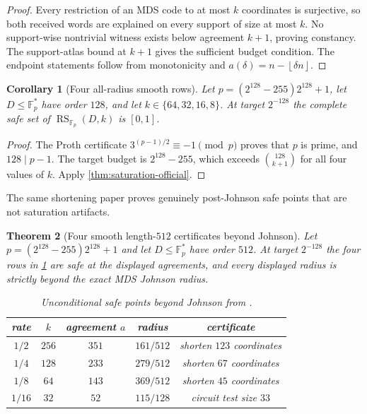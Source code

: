 \documentclass[11pt,a4paper]{amsart}
\numberwithin{equation}{section}
\newtheorem{theorem}{Theorem}[section]
\newtheorem{corollary}[theorem]{Corollary}
\theoremstyle{remark}
\DeclareMathOperator{\RS}{RS}
\newcommand{\F}{\mathbb F}
\newcommand{\floor}[1]{\left\lfloor#1\right\rfloor}
\begin{document}
\begin{proof}
Every restriction of an MDS code to at most $k$ coordinates is surjective, so both received words are explained on every support of size at most $k$.  No support-wise nontrivial witness exists below agreement $k+1$, proving constancy.  The support-atlas bound at $k+1$ gives the sufficient budget condition.  The endpoint statements follow from monotonicity and $a(\delta)=n-\floor{\delta n}$.
\end{proof}

\begin{corollary}[Four all-radius smooth rows]\label{cor:saturated-rows}
Let $p=(2^{128}-255)2^{128}+1$, let $D\le\F_p^*$ have order $128$, and let $k\in\{64,32,16,8\}$.  At target $2^{-128}$ the complete safe set of $\RS_{\F_p}(D,k)$ is $[0,1]$.
\end{corollary}

\begin{proof}
The Proth certificate $3^{(p-1)/2}\equiv-1\pmod p$ proves that $p$ is prime, and $128\mid p-1$.  The target budget is $2^{128}-255$, which exceeds $\binom{128}{k+1}$ for all four values of $k$.  Apply \cref{thm:saturation-official}.
\end{proof}

The same shortening paper proves genuinely post-Johnson safe points that are not saturation artifacts.

\begin{theorem}[Four smooth length-$512$ certificates beyond Johnson]\label{thm:length512}
Let $p=(2^{128}-255)2^{128}+1$ and let $D\le\F_p^*$ have order $512$.  At target $2^{-128}$ the four rows in \cref{tab:length512} are safe at the displayed agreements, and every displayed radius is strictly beyond the exact MDS Johnson radius.
\begin{table}[ht]
\centering
\caption{Unconditional safe points beyond Johnson from \cite{ChoShort26}.}
\label{tab:length512}
\begin{tabular}{@{}ccccc@{}}
\toprule
rate & $k$ & agreement $a$ & radius & certificate\\
\midrule
$1/2$ & $256$ & $351$ & $161/512$ & shorten $123$ coordinates\\
$1/4$ & $128$ & $233$ & $279/512$ & shorten $67$ coordinates\\
$1/8$ & $64$ & $143$ & $369/512$ & shorten $45$ coordinates\\
$1/16$& $32$ & $52$  & $115/128$ & circuit test size $33$\\
\bottomrule
\end{tabular}
\end{table}
\end{theorem}
\end{document}
